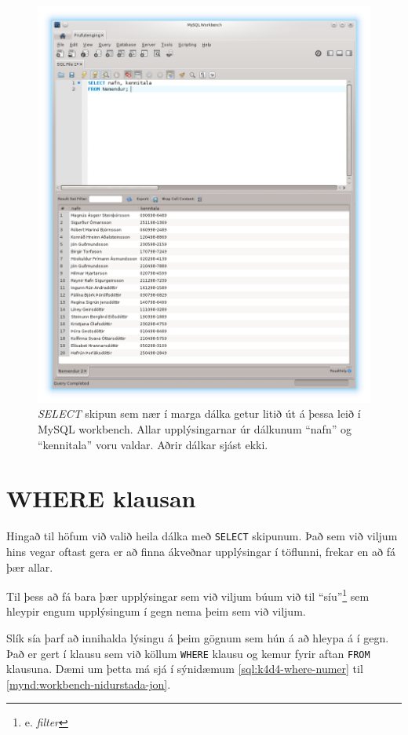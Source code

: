 \begin{figure}
\caption[Niðurstöður margra dálka SELECT í Workbench]{\emph{SELECT} skipun sem nær í marga dálka getur litið út á þessa leið í MySQL workbench. Allar upplýsingarnar úr dálkunum ``nafn'' og ``kennitala'' voru valdar. Aðrir dálkar sjást ekki.}
\label{mynd:workbench-nidurstada-margir-dalkar}
\centering
\includegraphics[width=\linewidth]{myndir/workbench-nidurstada-margir-dalkar}
\end{figure}

\newpage
\section{WHERE klausan}
Hingað til höfum við valið heila dálka með \verb|SELECT| skipunum. Það sem við viljum hins vegar oftast gera er að finna ákveðnar upplýsingar í töflunni, frekar en að fá þær allar.

Til þess að fá bara þær upplýsingar sem við viljum búum við til ``síu''\footnote{e. \emph{filter}} sem hleypir engum upplýsingum í gegn nema þeim sem við viljum.

Slík sía þarf að innihalda lýsingu á þeim gögnum sem hún á að hleypa á í gegn. Það er gert í klausu sem við köllum \verb|WHERE| klausu og kemur fyrir aftan \verb|FROM| klausuna. Dæmi um þetta má sjá í sýnidæmum \ref{sql:k4d4-where-numer} til \ref{mynd:workbench-nidurstada-jon}.

